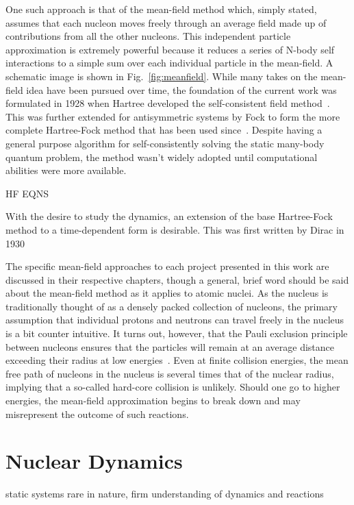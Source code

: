 One such approach is that of the mean-field method which, simply stated, assumes that each nucleon moves freely through an average field made up of contributions from all the other nucleons.
This independent particle approximation is extremely powerful because it reduces a series of N-body self interactions to a simple sum over each individual particle in the mean-field.
A schematic image is shown in Fig.~\ref{fig:meanfield}.
While many takes on the mean-field idea have been pursued over time, the foundation of the current work was formulated in 1928 when Hartree developed the self-consistent field method~\citep{hartree1928}.
This was further extended for antisymmetric systems by Fock to form the more complete Hartree-Fock method that has been used since~\citep{fock1930}.
Despite having a general purpose algorithm for self-consistently solving the static many-body quantum problem, the method wasn't widely adopted until computational abilities were more available.

HF EQNS

With the desire to study the dynamics, an extension of the base Hartree-Fock method to a time-dependent form is desirable.
This was first written by Dirac in 1930

\citep{dirac1930,kohn1965}

The specific mean-field approaches to each project presented in this work are discussed in their respective chapters, though a general, brief word should be said about the mean-field method as it applies to atomic nuclei.
As the nucleus is traditionally thought of as a densely packed collection of nucleons, the primary assumption that individual protons and neutrons can travel freely in the nucleus is a bit counter intuitive.
It turns out, however, that the Pauli exclusion principle between nucleons ensures that the particles will remain at an average distance exceeding their radius at low energies~\citep{ring1980}.
Even at finite collision energies, the mean free path of nucleons in the nucleus is several times that of the nuclear radius, implying that a so-called hard-core collision is unlikely.
Should one go to higher energies, the mean-field approximation begins to break down and may misrepresent the outcome of such reactions.

\section{Nuclear Dynamics}

static systems rare in nature, firm understanding of dynamics and reactions

